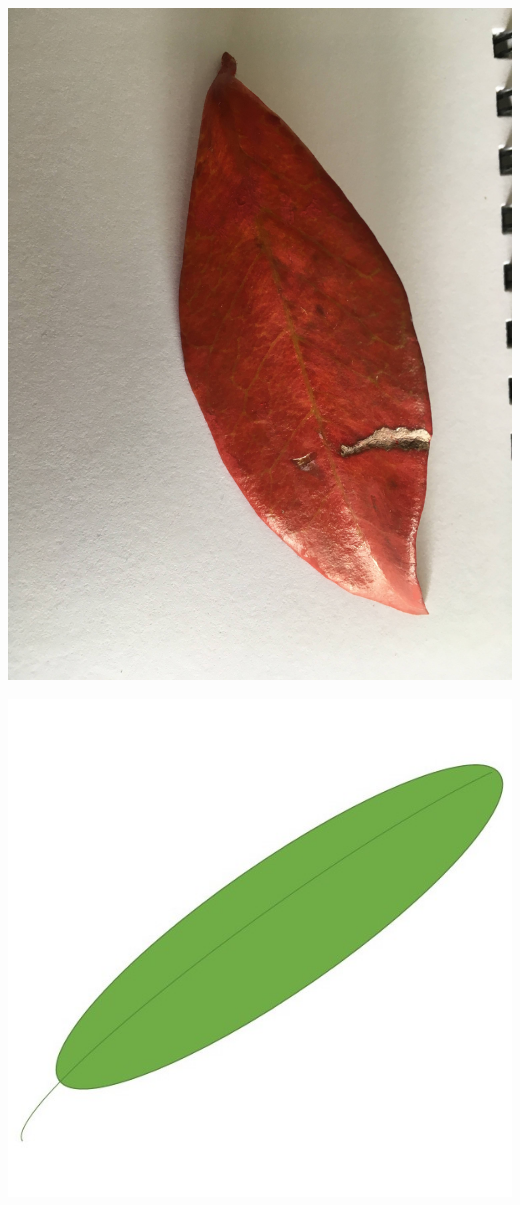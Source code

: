 \documentclass[12pt, letter]{article}
\begin{document}
\includegraphics[width=\textwidth,height=\textheight,keepaspectratio]{leaf-photo.jpg}
\newpage

\includegraphics[width=\textwidth,height=\textheight,keepaspectratio]{leaf-powerpoint2shapes.jpg}
\newpage
\end{document}
